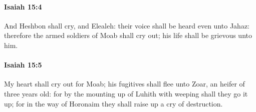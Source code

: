 		\paragraph{Isaiah 15:4} %
			\label{ISAIAH-15-4}

			And Heshbon shall cry, and Elealeh: their voice shall be heard even unto Jahaz: therefore the armed soldiers of Moab shall cry out; his life shall be grievous unto him.


		\paragraph{Isaiah 15:5} %
			\label{ISAIAH-15-5}

			My heart shall cry out for Moab; his fugitives shall flee unto Zoar, an heifer of three years old: for by the mounting up of Luhith with weeping shall they go it up; for in the way of Horonaim they shall raise up a cry of destruction.

